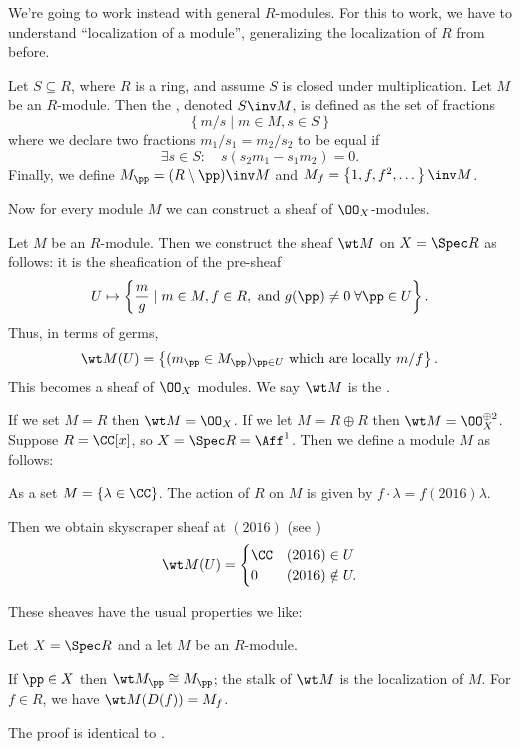 We're going to work instead with general $R$-modules.
For this to work, we have to understand ``localization of a module'',
generalizing the localization of $R$ from before.
\begin{definition}
	Let $S \subseteq R$, where $R$ is a ring,
	and assume $S$ is closed under multiplication.
	Let $M$ be an $R$-module.
	Then the , denoted $S\inv M$,
	is defined as the set of fractions
	\[ \left\{ m/s \mid m \in M, s \in S \right\} \]
	where we declare two fractions $m_1 / s_1 = m_2 / s_2$ 
	to be equal if 
	\[ \exists s \in S : \quad s(s_2m_1 - s_1m_2) = 0. \]
	Finally, we define $M_\pp = (R\setminus\pp)\inv M$
	and $M_f = \left\{ 1, f, f^2, \dots \right\}\inv M$.
\end{definition}
Now for every module $M$ we can construct a sheaf of $\OO_X$-modules.
\begin{definition}
	Let $M$ be an $R$-module.
	Then we construct the sheaf $\wt M$ on $X = \Spec R$ as follows:
	it is the sheafication of the pre-sheaf
	\[ U \mapsto 
		\left\{ \frac{m}{g} \mid m \in M, f \in R,
			\text{ and }
			g(\pp) \neq 0 \;\forall \pp \in U \right\}.
	\]
	Thus, in terms of germs,
	\[
		\wt M(U)
		= \left\{ (m_\pp \in M_\pp)_{\pp \in U} \text{ which are locally $m/f$} \right\}.
	\]
	This becomes a sheaf of $\OO_X$ modules.
	We say $\wt M$ is the .
\end{definition}
\begin{example}
	\listhack
	\begin{enumerate}[(a)]
		\ii If we set $M = R$ then $\wt M = \OO_X$.
		\ii If we let $M = R \oplus R$ then $\wt M = \OO_X^{\oplus 2}$.
		\ii Suppose $R = \CC[x]$, so $X = \Spec R = \Aff^1$.
		Then we define a module $M$ as follows:
		\begin{itemize}
			\ii As a set $M = \{ \lambda \in \CC \}$.
			\ii The action of $R$ on $M$ is
			given by $f \cdot \lambda = f(2016)\lambda$.
		\end{itemize}
		Then we obtain skyscraper sheaf at $(2016)$ (see )
		\[ 
			\wt M(U) 
			=
			\begin{cases}
				\CC & (2016) \in U \\
				0 & (2016) \notin U.
			\end{cases}
		\]
	\end{enumerate}
\end{example}
These sheaves have the usual properties we like:
\begin{theorem}
	Let $X = \Spec R$ and a let $M$ be an $R$-module.
	\begin{enumerate}[(a)]
		\ii If $\pp \in X$ then $\wt M_\pp \cong M_\pp$;
		the stalk of $\wt M$ is the localization of $M$.
		\ii For $f \in R$, we have $\wt M(D(f)) = M_f$.
	\end{enumerate}
\end{theorem}
The proof is identical to .

